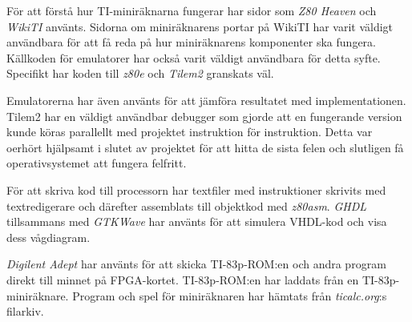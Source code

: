 \documentclass[main.tex]{subfiles}
\begin{document}
För att förstå hur TI-miniräknarna fungerar har sidor som {\it Z80
Heaven}\cite{z80heaven} och {\it WikiTI}\cite{wikiti} använts. Sidorna om
miniräknarens portar på WikiTI har varit väldigt användbara för att få reda på
hur miniräknarens komponenter ska fungera. Källkoden för emulatorer har också
varit väldigt användbara för detta syfte. Specifikt har koden till {\it
z80e}\cite{z80e} och {\it Tilem2}\cite{tilem2} granskats väl.

Emulatorerna har även använts för att jämföra resultatet med implementationen.
Tilem2 har en väldigt användbar debugger som gjorde att en fungerande version
kunde köras parallellt med projektet instruktion för instruktion. Detta var
oerhört hjälpsamt i slutet av projektet för att hitta de sista felen och
slutligen få operativsystemet att fungera felfritt.

För att skriva kod till processorn har textfiler med instruktioner skrivits med
textredigerare och därefter assemblats till objektkod med {\it
z80asm}\cite{z80asm}. {\it GHDL}\cite{ghdl} tillsammans med {\it
GTKWave}\cite{gtkwave} har använts för att simulera VHDL-kod och visa dess
vågdiagram.

{\it Digilent Adept} har använts för att skicka TI-83p-ROM:en och andra program
direkt till minnet på FPGA-kortet. TI-83p-ROM:en har laddats från en
TI-83p-miniräknare. Program och spel för miniräknaren har hämtats från {\it
ticalc.org}:s filarkiv\cite{ticalc}.
\end{document}
